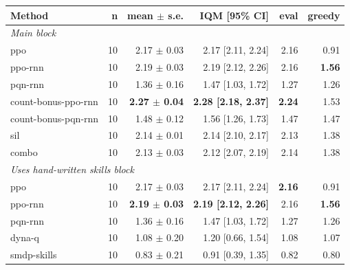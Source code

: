 \begin{tabular}{lrrrrr}
\toprule
Method & n & mean $\pm$ s.e. & IQM [95\% CI] & eval & greedy \\
\midrule
\multicolumn{6}{l}{\emph{Main block}} \\
ppo & 10 & 2.17 $\pm$ 0.03 & 2.17 [2.11, 2.24] & 2.16 & 0.91 \\
ppo-rnn & 10 & 2.19 $\pm$ 0.03 & 2.19 [2.12, 2.26] & 2.16 & \textbf{1.56} \\
pqn-rnn & 10 & 1.36 $\pm$ 0.16 & 1.47 [1.03, 1.72] & 1.27 & 1.26 \\
count-bonus-ppo-rnn & 10 & \textbf{2.27 $\pm$ 0.04} & \textbf{2.28 [2.18, 2.37]} & \textbf{2.24} & 1.53 \\
count-bonus-pqn-rnn & 10 & 1.48 $\pm$ 0.12 & 1.56 [1.26, 1.73] & 1.47 & 1.47 \\
sil & 10 & 2.14 $\pm$ 0.01 & 2.14 [2.10, 2.17] & 2.13 & 1.38 \\
combo & 10 & 2.13 $\pm$ 0.03 & 2.12 [2.07, 2.19] & 2.14 & 1.38 \\
\midrule
\multicolumn{6}{l}{\emph{Uses hand-written skills block}} \\
ppo & 10 & 2.17 $\pm$ 0.03 & 2.17 [2.11, 2.24] & \textbf{2.16} & 0.91 \\
ppo-rnn & 10 & \textbf{2.19 $\pm$ 0.03} & \textbf{2.19 [2.12, 2.26]} & 2.16 & \textbf{1.56} \\
pqn-rnn & 10 & 1.36 $\pm$ 0.16 & 1.47 [1.03, 1.72] & 1.27 & 1.26 \\
dyna-q & 10 & 1.08 $\pm$ 0.20 & 1.20 [0.66, 1.54] & 1.08 & 1.07 \\
smdp-skills & 10 & 0.83 $\pm$ 0.21 & 0.91 [0.39, 1.35] & 0.82 & 0.80 \\
\bottomrule
\end{tabular}
